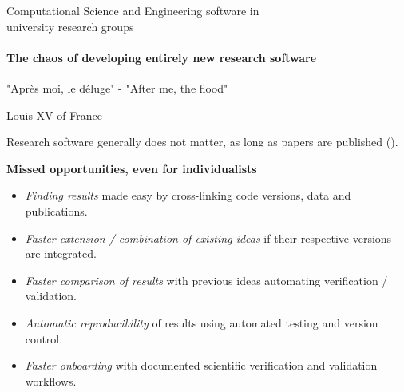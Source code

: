 \begin{frame}{Computational Science and Engineering software in\\university research groups}
    \framesubtitle{The chaos of developing entirely new research software}
    \vfill

    \epigraph{"Après moi, le déluge" - "After me, the flood"}{\href{https://en.wikipedia.org/wiki/Apr\%C3\%A8s_moi,_le_d\%C3\%A9luge}{Louis XV of France}}

    Research software generally does not matter, as long as papers are published (\faGraduationCap).
    
    \medskip

    \textbf{Missed opportunities, even for individualists}
    \begin{itemize}
        \item \emph{Finding results} made easy by cross-linking code versions, data and publications. 
        \item \emph{Faster extension / combination of existing ideas} if their respective versions are integrated. 
        \item \emph{Faster comparison of results} with previous ideas automating verification / validation. 
        \item \emph{Automatic reproducibility} of results using automated testing and version control. 
        \item \emph{Faster onboarding} with documented scientific verification and validation workflows. 
    \end{itemize}

\end{frame}

